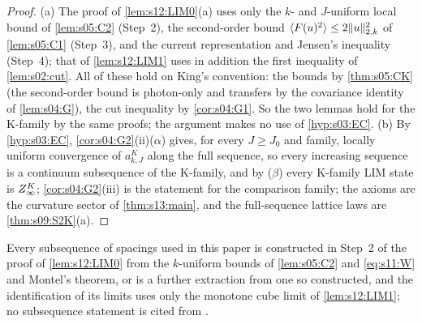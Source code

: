 \begin{proof}
(a) The proof of \cref{lem:s12:LIM0}(a) uses only the $k$- and $J$-uniform local bound of \cref{lem:s05:C2} (Step~2), the second-order bound $\langle F(u)^2\rangle\le2\lVert u\rVert^2_{2,k}$ of \cref{lem:s05:C1} (Step~3), and the current representation and Jensen's inequality (Step~4); that of \cref{lem:s12:LIM1} uses in addition the first inequality of \cref{lem:s02:cut}. All of these hold on King's convention: the bounds by \cref{thm:s05:CK} (the second-order bound is photon-only and transfers by the covariance identity of \cref{lem:s04:G}), the cut inequality by \cref{cor:s04:G1}. So the two lemmas hold for the K-family by the same proofs; the argument makes no use of \cref{hyp:s03:EC}. (b) By \cref{hyp:s03:EC}, \cref{cor:s04:G2}(ii)($\alpha$) gives, for every $J\ge J_0$ and family, locally uniform convergence of $a^K_{k,J}$ along the full sequence, so every increasing sequence is a continuum subsequence of the K-family, and by ($\beta$) every K-family LIM state is $Z^{K}_{\infty}$; \cref{cor:s04:G2}(iii) is the statement for the comparison family; the axioms are the curvature sector of \cref{thm:s13:main}, and the full-sequence lattice laws are \cref{thm:s09:S2K}(a).
\end{proof}

\begin{remark}\label{rem:s12:K9}
Every subsequence of spacings used in this paper is constructed in Step~2 of the proof of \cref{lem:s12:LIM0} from the $k$-uniform bounds of \cref{lem:s05:C2} and \eqref{eq:s11:W} and Montel's theorem, or is a further extraction from one so constructed, and the identification of its limits uses only the monotone cube limit of \cref{lem:s12:LIM1}; no subsequence statement is cited from \cite{K2}.
\end{remark}
